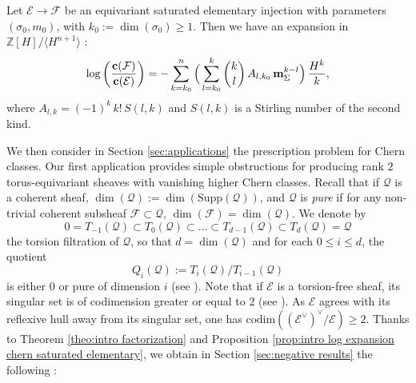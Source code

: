 \documentclass[a4paper,10pt]{amsart}
\theoremstyle{plain}{
    \newtheorem{theorem}{Theorem}[section]
    \newtheorem{lemma}[theorem]{Lemma}
    \newtheorem{corollary}[theorem]{Corollary}
    \newtheorem{proposition}[theorem]{Proposition}
    \newtheorem{conjecture}[theorem]{Conjecture}
}
\theoremstyle{definition}{
    \newtheorem{definition}[theorem]{Definition}
    \newtheorem{defn-thm}[theorem]{Definition-Theorem}
    \newtheorem{example}[theorem]{Example}
    \newtheorem{notation}[theorem]{Notation}
}
\theoremstyle{remark}{
    \newtheorem{remark}[theorem]{Remark}
    \newtheorem{problem}[theorem]{Problem}
    \newtheorem{question}[theorem]{Question}
}
\def\um{{\bf m}}
\def\uc{{\bf c}}
\def\cF{\mathcal{F}}
\def\cE{\mathcal{E}}
\def\cQ{\mathcal{Q}}
\def\Z{\mathbb{Z}}
\def\codim{\mathrm{codim}}
\def\Supp{\mathrm{Supp}}
\begin{document}
\begin{proposition}
 \label{prop:intro log expansion chern saturated elementary}
  Let $\cE\to \cF$ be an equivariant saturated elementary injection with parameters $(\sigma_0,m_0)$, with $k_0:=\dim(\sigma_0)\geq 1$. Then we have an expansion in $\Z[H]/\langle H^{n+1} \rangle$ :
 \begin{equation}
  \label{eq:intro log expansion saturated elementary}
  \log\left(\frac{\uc(\cF)}{\uc(\cE)}\right)=-\sum_{k=k_0}^n \Big(\sum_{l=k_0}^k \binom{k}{l}\, A_{l,k_0}\, \um_\Sigma^{k-l} \Big)\, \frac{H^k}{k},
 \end{equation}
where $A_{l,k}=(-1)^k\,k!\,S(l,k)$ and $S(l,k)$ is a Stirling number of the second kind.
 \end{proposition}
  
 We then consider in Section \ref{sec:applications} the prescription problem for Chern classes. Our first application provides simple obstructions for producing rank $2$ torus-equivariant sheaves with vanishing higher Chern classes. Recall that if $\cQ$ is a coherent sheaf, $\dim(\cQ):=\dim(\Supp(\cQ))$, and $\cQ$ is {\it pure} if for any non-trivial coherent subsheaf $\cF\subset\cQ$, $\dim(\cF)=\dim(\cQ)$. We denote by 
$$
0=T_{-1}(\cQ)\subset T_0(\cQ)\subset\ldots\subset T_{d-1}(\cQ)\subset T_d(\cQ)=\cQ
$$
the torsion filtration of $\cQ$, so that $d=\dim(\cQ)$ and for each $0\leq i \leq d$, the quotient $$Q_i(\cQ):=T_i(\cQ)/T_{i-1}(\cQ)$$ is either $0$ or pure of dimension $i$ (see \cite[Chapter 1]{HuLe}). Note that if $\cE$ is a torsion-free sheaf, its singular set is of codimension greater or equal to $2$ (see \cite[Chapter 2.1]{OSS}). As $\cE$ agrees with its reflexive hull away from its singular set, one has $\codim((\cE^\vee)^\vee/\cE)\geq 2$. Thanks to Theorem \ref{theo:intro factorization} and Proposition \ref{prop:intro log expansion chern saturated elementary}, we obtain in Section \ref{sec:negative results} the following :
\end{document}
